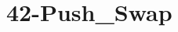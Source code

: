 \chapter{42-\/Push\+\_\+\+Swap}
\hypertarget{md_README}{}\label{md_README}
\label{md_README_autotoc_md0}%
%
